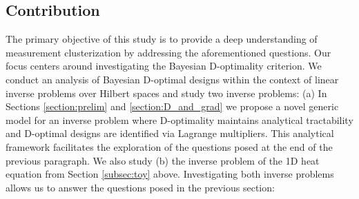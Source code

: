 \documentclass[ba]{imsart}
\theoremstyle{plain}
\theoremstyle{definition}
\theoremstyle{remark}
\begin{document}
\subsection{Contribution}
The primary objective of this study is to provide a deep understanding
of measurement clusterization by addressing the aforementioned
questions. Our focus centers around investigating the Bayesian
D-optimality criterion. We conduct an analysis of Bayesian D-optimal
designs within the context of linear inverse problems over Hilbert
spaces and study two inverse problems: (a) In Sections
\ref{section:prelim} and \ref{section:D_and_grad} we propose a novel
generic model for an inverse problem where D-optimality maintains
analytical tractability and D-optimal designs are identified via
Lagrange multipliers. This analytical framework facilitates the
exploration of the questions posed at the end of the previous
paragraph. We also study (b) the inverse problem of the 1D heat
equation from Section \ref{subsec:toy} above. Investigating both
inverse problems allows us to answer the questions posed in the
previous section:
\end{document}
